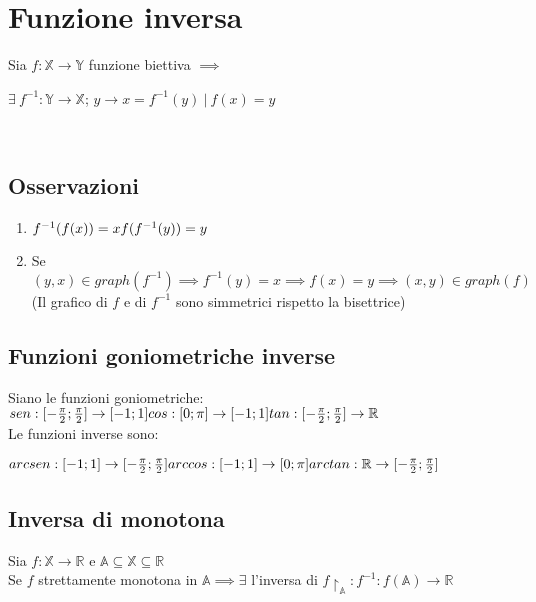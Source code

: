 \section{Funzione inversa}
Sia $f: \mathbb{X} \rightarrow \mathbb{Y}$ funzione biettiva $\implies$\\
\begin{Large}
$\exists\ f^{-1}: \mathbb{Y} \rightarrow \mathbb{X}$;  $y \rightarrow x = f^{-1}(y)\ |\ f(x) = y$
\end{Large}\\
\subsection{Osservazioni}
\begin{enumerate}
\item $f^{-1}(f(x))=x\\
f(f^{-1}(y))=y$
\item Se $(y,x) \in graph(f^{-1}) \implies f^{-1}(y) = x \implies f(x)=y \implies (x,y) \in graph(f)$\\
(Il grafico di $f$ e di $f^{-1}$ sono simmetrici rispetto la bisettrice)
\end{enumerate}
\subsection{Funzioni goniometriche inverse}
Siano le funzioni goniometriche:\\
$sen: [-\frac{\pi}{2};\frac{\pi}{2}] \rightarrow [-1;1]\\
cos: [0;\pi] \rightarrow [-1;1]\\
tan: [-\frac{\pi}{2};\frac{\pi}{2}] \rightarrow \mathbb{R}$\\
Le funzioni inverse sono:\\
\begin{Large}
$arcsen: [-1;1] \rightarrow [-\frac{\pi}{2};\frac{\pi}{2}]\\
arccos: [-1;1] \rightarrow [0;\pi]\\
arctan: \mathbb{R} \rightarrow [-\frac{\pi}{2};\frac{\pi}{2}]$
\end{Large}

\subsection{Inversa di monotona}
Sia $f: \mathbb{X} \rightarrow \mathbb{R}$ e $\mathbb{A} \subseteq \mathbb{X} \subseteq \mathbb{R}$\\
Se $f$ strettamente monotona in $\mathbb{A} \implies \exists $
 l'inversa di $f\restriction _\mathbb{A}: f^{-1}: f(\mathbb{A}) \rightarrow \mathbb{R}$